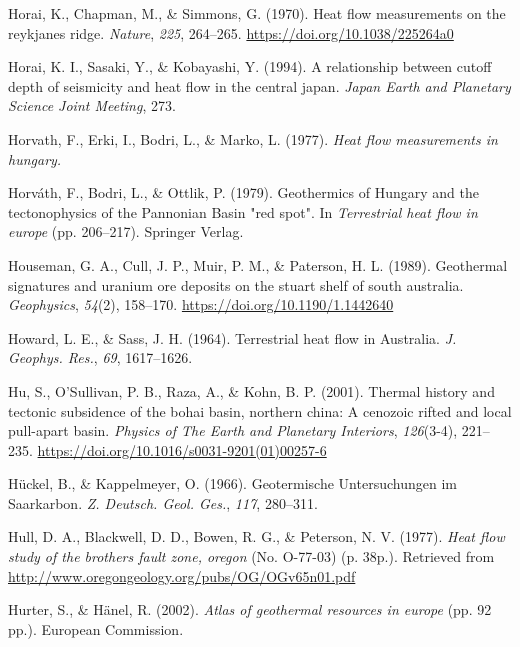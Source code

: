 \begin{CSLReferences}{1}{1}
\leavevmode{}%
Horai, K., Chapman, M., \& Simmons, G. (1970). Heat flow measurements on the reykjanes ridge. \emph{Nature}, \emph{225}, 264--265. \url{https://doi.org/10.1038/225264a0}

\leavevmode{}%
Horai, K. I., Sasaki, Y., \& Kobayashi, Y. (1994). A relationship between cutoff depth of seismicity and heat flow in the central japan. \emph{Japan Earth and Planetary Science Joint Meeting}, 273.

\leavevmode{}%
Horvath, F., Erki, I., Bodri, L., \& Marko, L. (1977). \emph{Heat flow measurements in hungary.}

\leavevmode{}%
Horváth, F., Bodri, L., \& Ottlik, P. (1979). Geothermics of {Hungary} and the tectonophysics of the {Pannonian Basin} "red spot". In \emph{Terrestrial heat flow in europe} (pp. 206--217). Springer Verlag.

\leavevmode{}%
Houseman, G. A., Cull, J. P., Muir, P. M., \& Paterson, H. L. (1989). Geothermal signatures and uranium ore deposits on the stuart shelf of south australia. \emph{Geophysics}, \emph{54}(2), 158--170. \url{https://doi.org/10.1190/1.1442640}

\leavevmode{}%
Howard, L. E., \& Sass, J. H. (1964). Terrestrial heat flow in {Australia}. \emph{J. Geophys. Res.}, \emph{69}, 1617--1626.

\leavevmode{}%
Hu, S., O'Sullivan, P. B., Raza, A., \& Kohn, B. P. (2001). Thermal history and tectonic subsidence of the bohai basin, northern china: A cenozoic rifted and local pull-apart basin. \emph{Physics of The Earth and Planetary Interiors}, \emph{126}(3-4), 221--235. \url{https://doi.org/10.1016/s0031-9201(01)00257-6}

\leavevmode{}%
Hückel, B., \& Kappelmeyer, O. (1966). Geotermische {Untersuchungen im Saarkarbon}. \emph{Z. Deutsch. Geol. Ges.}, \emph{117}, 280--311.

\leavevmode{}%
Hull, D. A., Blackwell, D. D., Bowen, R. G., \& Peterson, N. V. (1977). \emph{Heat flow study of the brothers fault zone, oregon} (No. O-77-03) (p. 38p.). Retrieved from \url{http://www.oregongeology.org/pubs/OG/OGv65n01.pdf}

\leavevmode{}%
Hurter, S., \& Hänel, R. (2002). \emph{Atlas of geothermal resources in europe} (pp. 92 pp.). European Commission.


\end{CSLReferences}
